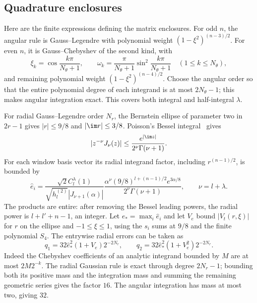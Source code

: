 \subsection{Quadrature enclosures}\label{gd:sec:quadrature}
Here are the finite expressions defining the matrix enclosures.
For odd $n$, the angular rule is Gauss--Legendre with polynomial weight
$(1-\xi^2)^{(n-3)/2}$.
For even $n$, it is Gauss--Chebyshev of the second kind, with
\[
 \xi_k=\cos\frac{k\pi}{N_\theta+1},\qquad
 \omega_k=\frac{\pi}{N_\theta+1}
             \sin^2\frac{k\pi}{N_\theta+1}\quad(1\le k\le N_\theta),
\]
and remaining polynomial weight $(1-\xi^2)^{(n-4)/2}$.
Choose the angular order so that the entire polynomial degree of each
integrand is at most $2N_\theta-1$; this makes angular integration exact.
This covers both integral and half-integral $\lambda$.

For radial Gauss--Legendre order $N_r$, the Bernstein ellipse of parameter
two in $2r-1$ gives $|r|\le9/8$ and $|\im r|\le3/8$.
Poisson's Bessel integral~\cite[10.9.4]{DLMF} gives
\[
 |z^{-\nu}J_\nu(z)|\le
 \frac{e^{|\im z|}}{2^\nu\Gamma(\nu+1)}.
\]
For each window basis vector its radial integrand factor, including
$r^{(n-1)/2}$, is bounded by
\begin{equation}\label{gd:eq:ellipse}
 \hat e_i=\frac{\sqrt2C_l^\lambda(1)}
 {\sqrt{h_l^{(2)}}|J_{\nu+1}(\alpha)|}
 \frac{\alpha^\nu(9/8)^{l+(n-1)/2}e^{3\alpha/8}}
 {2^\nu\Gamma(\nu+1)},\qquad \nu=l+\lambda .
\end{equation}
The products are entire: after removing the Bessel leading powers,
the radial power is $l+l'+n-1$, an integer.
Let $\hat e_*=\max_i\hat e_i$ and let $V_e$ bound $|V_t(r,\xi)|$ for $r$ on the ellipse
and $-1\le\xi\le1$, using the $s_i$ sums at $9/8$ and the finite
polynomial $S_4$. The entrywise radial errors can be taken as
\begin{equation}\label{gd:eq:quadrature-errors}
 q_1=32\hat e_*^2(1+V_e)2^{-2N_r},\qquad
 q_2=32\hat e_*^2(1+V_e^2)2^{-2N_r}.
\end{equation}
Indeed the Chebyshev coefficients of an analytic integrand bounded by
$M$ are at most $2M2^{-k}$. The radial Gaussian rule is exact through
degree $2N_r-1$; bounding both its positive mass and the integration
mass and summing the remaining geometric series gives the factor
$16$. The angular integration has mass at most two, giving $32$.

